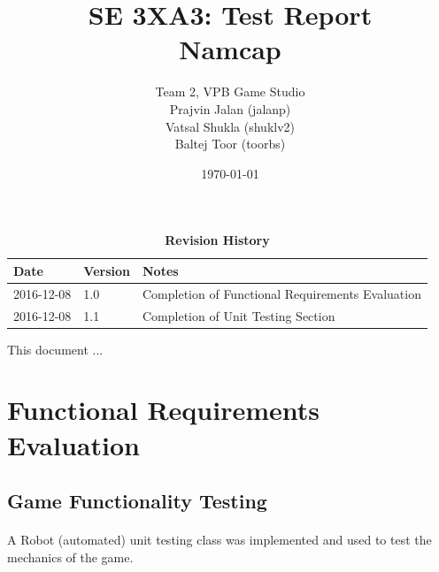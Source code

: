 \documentclass[12pt, titlepage]{article}
\title{SE 3XA3: Test Report\\Namcap}
\author{Team 2, VPB Game Studio
		\\ Prajvin Jalan (jalanp)
		\\ Vatsal Shukla (shuklv2)
		\\ Baltej Toor (toorbs)
}
\date{\today}
\begin{document}
\maketitle

\tableofcontents
\listoftables
\listoffigures

\begin{table}[h]
\caption{\bf Revision History}
\begin{tabularx}{\textwidth}{p{3cm}p{2cm}X}
\toprule {\bf Date} & {\bf Version} & {\bf Notes}\\
\midrule
2016-12-08 & 1.0 & Completion of Functional Requirements Evaluation\\
2016-12-08 & 1.1 & Completion of Unit Testing Section\\
\bottomrule
\end{tabularx}
\end{table}

\newpage


This document ...

\section{Functional Requirements Evaluation}

\subsection{Game Functionality Testing}

\paragraph{}
A Robot (automated) unit testing class was implemented and used to test the mechanics of the game.
\end{document}
